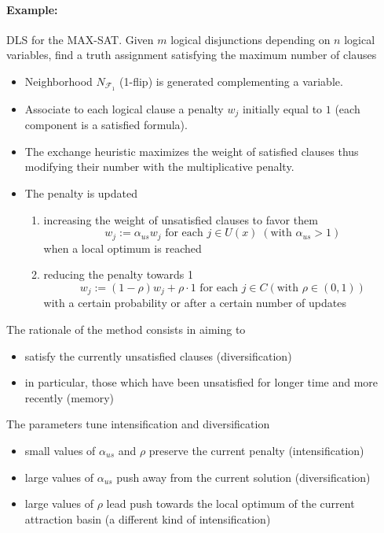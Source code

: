 \documentclass[11pt]{article}
\begin{document}
	\paragraph{Example:} DLS for the MAX-SAT. Given $m$ logical disjunctions depending on $n$ logical variables, find a truth assignment satisfying the maximum number of clauses
	\begin{itemize}
		\item Neighborhood $N_{\mathcal{F}_1}$ (1-flip) is generated complementing a variable.\\
		
		\item Associate to each logical clause a penalty $w_j$ initially equal to $1$ (each component is a satisfied formula).\\
		
		\item The exchange heuristic maximizes the weight of satisfied clauses thus modifying their number with the multiplicative penalty.\\
		
		\item The penalty is updated
		\begin{enumerate}
			\item increasing the weight of unsatisfied clauses to favor them
			$$ w_j := \alpha_{us} w_j \text{ for each } j \in U (x) \; (\text{with } \alpha_{us} > 1) $$
			when a local optimum is reached
			
			\item reducing the penalty towards 1
			$$ w_j := (1 - \rho) w_j + \rho \cdot 1 \text{ for each } j \in C (\text{with } \rho \in (0, 1)) $$
			with a certain probability or after a certain number of updates
		\end{enumerate}
	\end{itemize}
	
	The rationale of the method consists in aiming to
	\begin{itemize}
		\item satisfy the currently unsatisfied clauses (diversification)
		
		\item in particular, those which have been unsatisfied for longer time and more recently (memory)
	\end{itemize}
	
	The parameters tune intensification and diversification
	\begin{itemize}
		\item small values of $\alpha_{us}$ and $\rho$ preserve the current penalty (intensification)
		
		\item large values of $\alpha_{us}$ push away from the current solution (diversification)
		
		\item large values of $\rho$ lead push towards the local optimum of the current attraction basin (a different kind of intensification)
	\end{itemize}
	
\end{document}
